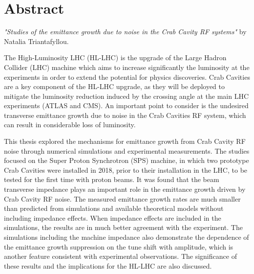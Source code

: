 \cleardoublepage
\chapter*{Abstract}
\thispagestyle{simple} %

\textit{"Studies of the emittance growth due to noise in the Crab Cavity RF systems"} by Natalia Triantafyllou.

The High-Luminosity LHC (HL-LHC) is the upgrade of the Large Hadron Collider (LHC) machine which aims to increase significantly the luminosity at the experiments in order to extend the potential for physics discoveries. Crab Cavities are a key component of the HL-LHC upgrade, as they will be deployed to mitigate the luminosity reduction induced by the crossing angle at the main LHC experiments (ATLAS and CMS). An important point to consider is the undesired transverse emittance growth due to noise in the Crab Cavities RF system, which can result in considerable loss of luminosity.

This thesis explored the mechanisms for emittance growth from Crab Cavity RF noise through numerical simulations and experimental measurements. The studies focused on the Super Proton Synchrotron (SPS) machine, in which two prototype Crab Cavities were installed in 2018, prior to their installation in the LHC, to be tested for the first time with proton beams. It was found that the beam transverse impedance plays an important role in the emittance growth driven by Crab Cavity RF noise. The measured emittance growth rates are much smaller than predicted from simulations and available theoretical models without including impedance effects. When impedance effects are included in the simulations, the results are in much better agreement with the experiment. The simulations including the machine impedance also demonstrate the dependence of the emittance growth suppression on the tune shift with amplitude, which is another feature consistent with experimental observations. The significance of these results and the implications for the HL-LHC are also discussed.





